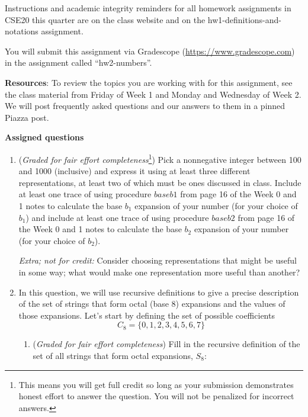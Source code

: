 \documentclass[12pt, oneside]{article}
\begin{document}
Instructions and academic integrity reminders for all homework assignments in 
CSE20 this quarter are on the class website and on the hw1-definitions-and-notations
assignment.


You will submit this assignment via Gradescope
(\href{https://www.gradescope.com}{https://www.gradescope.com}) 
in the assignment called ``hw2-numbers''.


{\bf Resources}: To review the topics you are working with 
for this assignment, see the class material from Friday of Week 1 and Monday
 and Wednesday of Week 2.
We will post frequently asked questions and our answers to them in a 
pinned Piazza post.

{\bf Assigned questions}

\begin{enumerate}
    \item ({\it Graded for fair effort completeness}\footnote{This means 
    you will get full credit so long as your submission demonstrates honest 
    effort to answer the question. You will not be penalized for incorrect answers.})
    Pick a nonnegative integer between 100 and 1000 (inclusive) and express it using at 
    least three different representations, 
    at least two of which must be ones discussed in class. Include at least one
    trace of using procedure $baseb1$ from page 16 of the Week 0 and 1 notes
    to calculate the base $b_1$ expansion of your
    number (for your choice of $b_1$) and include at least one trace of using 
    procedure $baseb2$ from page 16 of the Week 0 and 1 notes
    to calculate the base $b_2$ expansion of your number
    (for your choice of $b_2$). 
    
    {\it Extra; not for credit:} Consider choosing representations that might be useful in 
    some way; what would make one representation more useful than another?

    \newpage
    \item In this question, we will use recursive definitions to give a precise description 
    of the set of strings that form octal (base $8$) expansions and the values
    of those expansions. Let's start by defining the set of possible coefficients
    \[
        C_8 = \{ 0, 1, 2, 3, 4, 5, 6, 7\}
    \]

    \begin{enumerate}
    \item ({\it Graded for fair effort completeness}) Fill in the recursive definition of the 
    set of all strings that form octal expansions, $S_8$: 
    

\end{enumerate}
\end{enumerate}
\end{document}

